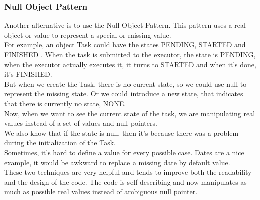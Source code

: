 \subsubsection{Null Object Pattern}
Another alternative is to use the Null Object Pattern.
This pattern uses a real object or value to represent a special or
missing value. \\
For example, an object Task could have the states PENDING, STARTED
and FINISHED .
When the task is submitted to the executor, the state is PENDING,
when the executor actually executes it, it turns to STARTED and when
it's done, it's FINISHED. \\
But when we create the Task, there is no current state, so we could use
null to represent the missing state.
Or we could introduce a new state, that indicates that there is currently
no state, NONE. \\
Now, when we want to see the current state of the task, we are
manipulating real values instead of a set of values and null pointers. \\
We also know that if the state is null, then it's because there was
a problem during the initialization of the Task. \\
Sometimes, it's hard to define a value for every possible case.
Dates are a nice example, it would be awkward to replace a missing date
by default value. \\
\newline
These two techniques are very helpful and tends to improve both the
readability and the design of the code.
The code is self describing and now manipulates as much as possible
real values instead of ambiguous null pointer.

